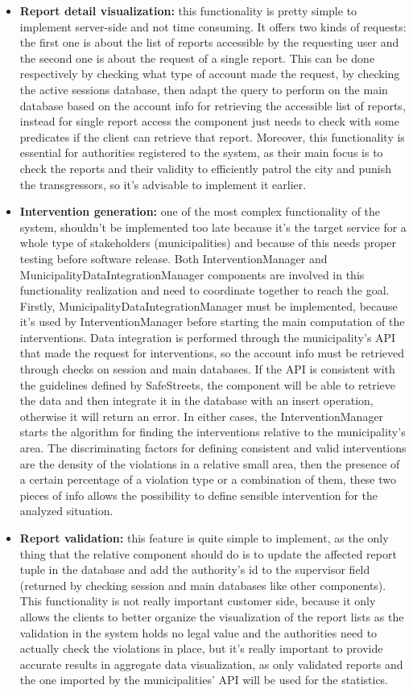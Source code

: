 \begin{itemize}
	\item \textbf{Report detail visualization:} this functionality is pretty simple to implement server-side and not time consuming. It offers two kinds of requests: the first one is about the list of reports accessible by the requesting user and the second one is about the request of a single report. This can be done respectively by checking what type of account made the request, by checking the active sessions database, then adapt the query to perform on the main database based on the account info for retrieving the accessible list of reports, instead for single report access the component just needs to check with some predicates if the client can retrieve that report. Moreover, this functionality is essential for authorities registered to the system, as their main focus is to check the reports and their validity to efficiently patrol the city and punish the transgressors, so it's advisable to implement it earlier.
	\item \textbf{Intervention generation:} one of the most complex functionality of the system, shouldn't be implemented too late because it's the target service for a whole type of stakeholders (municipalities) and because of this needs proper testing before software release. Both InterventionManager and MunicipalityDataIntegrationManager components are involved in this functionality realization and need to coordinate together to reach the goal. Firstly, MunicipalityDataIntegrationManager must be implemented, because it's used by InterventionManager before starting the main computation of the interventions. Data integration is performed through the municipality's API that made the request for interventions, so the account info must be retrieved through checks on session and main databases. If the API is consistent with the guidelines defined by SafeStreets, the component will be able to retrieve the data and then integrate it in the database with an insert operation, otherwise it will return an error. In either cases, the InterventionManager starts the algorithm for finding the interventions relative to the municipality's area. The discriminating factors for defining consistent and valid interventions are the density of the violations in a relative small area, then the presence of a certain percentage of a violation type or a combination of them, these two pieces of info allows the possibility to define sensible intervention for the analyzed situation.
	\item \textbf{Report validation:} this feature is quite simple to implement, as the only thing that the relative component should do is to update the affected report tuple in the database and add the authority's id to the supervisor field (returned by checking session and main databases like other components). This functionality is not really important customer side, because it only allows the clients to better organize the visualization of the report lists as the validation in the system holds no legal value and the authorities need to actually check the violations in place, but it's really important to provide accurate results in aggregate data visualization, as only validated reports and the one imported by the municipalities' API will be used for the statistics.

\end{itemize}
